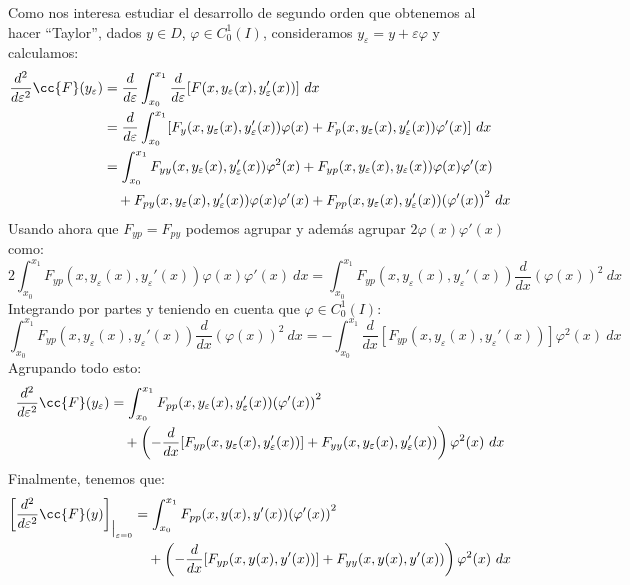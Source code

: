 \noindent
Como nos interesa estudiar el desarrollo de segundo orden que obtenemos al hacer ``Taylor'', dados $y\in D$, $\varphi \in C_0^1(I)$, consideramos $y_\varepsilon = y+\varepsilon\varphi$ y calculamos:
\begin{align*}
    \frac{d^2}{d\varepsilon^2}\cc{F}(y_\varepsilon) &= \frac{d}{d \varepsilon} \int_{x_0}^{x_1} \frac{d}{d\varepsilon}[F(x,y_\varepsilon(x),y_\varepsilon'(x))]~dx  \\
                                                    &= \frac{d}{d\varepsilon} \int_{x_0}^{x_1} [F_y(x,y_{\varepsilon}(x),y_\varepsilon'(x))\varphi(x) + F_p(x,y_\varepsilon(x),y_\varepsilon'(x))\varphi'(x)]~dx  \\
                                                    &= \int_{x_0}^{x_1} F_{yy} (x,y_\varepsilon(x),y_\varepsilon'(x))\varphi^2(x) + F_{yp}(x,y_\varepsilon(x),y_\varepsilon(x))\varphi(x)\varphi'(x) \\
                                                    &\quad + F_{py}(x,y_\varepsilon(x),y_\varepsilon'(x))\varphi(x)\varphi'(x) + F_{pp}(x,y_\varepsilon(x),y_\varepsilon'(x)){(\varphi'(x))}^{2}~dx 
\end{align*}
Usando ahora que $F_{yp} = F_{py}$ podemos agrupar y además agrupar $2\varphi(x)\varphi'(x)$ como:
\begin{equation*}
    2\int_{x_0}^{x_1} F_{yp}(x,y_\varepsilon(x),y_\varepsilon'(x))\varphi(x)\varphi'(x)~dx  = \int_{x_0}^{x_1} F_{yp}(x,y_\varepsilon(x),y_\varepsilon'(x)) \frac{d}{dx}{(\varphi(x))}^{2}~dx 
\end{equation*}
Integrando por partes y teniendo en cuenta que $\varphi \in C^1_0(I)$:
\begin{equation*}
     \int_{x_0}^{x_1} F_{yp}(x,y_\varepsilon(x),y_\varepsilon'(x)) \frac{d}{dx}{(\varphi(x))}^{2}~dx = -\int_{x_0}^{x_1} \frac{d}{dx}\left[F_{yp}(x,y_\varepsilon(x),y_\varepsilon'(x))\right]\varphi^2(x)~dx 
\end{equation*}
Agrupando todo esto:
\begin{align*}
    \frac{d^2}{d\varepsilon^2} \cc{F}(y_\varepsilon) &= \int_{x_0}^{x_1} F_{pp}(x,y_\varepsilon(x),y_\varepsilon'(x)){(\varphi'(x))}^{2} \\
                                                     &\quad + \left(-\frac{d}{dx}[F_{yp}(x,y_\varepsilon(x),y_\varepsilon'(x))] + F_{yy}(x,y_\varepsilon(x),y_\varepsilon'(x))\right)\varphi^2(x)~dx 
\end{align*}
Finalmente, tenemos que:
\begin{align*}
    \left[\frac{d^2}{d\varepsilon^2}\cc{F}(y)\right]_{ \big|_{\varepsilon = 0} }&= \int_{x_0}^{x_1} F_{pp}(x,y(x),y'(x)){(\varphi'(x))}^{2} \\
                                                                            &\quad + \left(-\frac{d}{dx}[F_{yp}(x,y(x),y'(x))] + F_{yy}(x,y(x),y'(x))\right)\varphi^2(x)~dx 
\end{align*}

